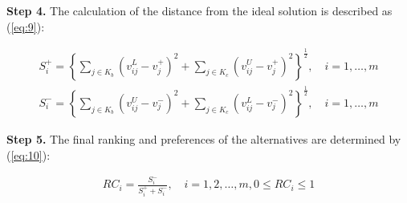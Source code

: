 \noindent \textbf{Step 4.} The calculation of the distance from the ideal solution is described as (\ref{eq:9}):

\begin{equation}
\begin{array}{lcl}
S_{i}^{+}=\left\{\sum_{j \in K_{b}}\left(v_{ij}^{L}-v_{j}^{+}\right)^{2}+\sum_{j \in K_{c}}\left(v_{i j}^{U}-v_{j}^{+}\right)^{2}\right\}^{\frac{1}{2}}, \quad i=1, \ldots, m \\
S_{i}^{-}=\left\{\sum_{j \in K_{b}}\left(v_{i j}^{U}-v_{j}^{-}\right)^{2}+\sum_{j \in K_{c}}\left(v_{i j}^{L}-v_{j}^{-}\right)^{2}\right\}^{\frac{1}{2}}, \quad i=1, \ldots, m
\end{array}
\label{eq:9}
\end{equation}

\noindent \textbf{Step 5.} The final ranking and preferences of the alternatives are determined by (\ref{eq:10}):

\begin{equation}
\begin{array}{lcl}
R C_{i}=\frac{S_{i}^{-}}{S_{i}^{+}+S_{i}^{-}}, \quad i=1,2, \ldots, m, 0 \leqslant R C_{i} \leqslant 1
\end{array}
\label{eq:10}
\end{equation}
